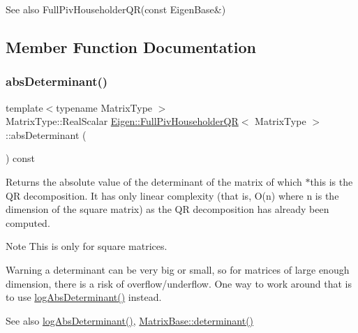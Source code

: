 \begin{DoxySeeAlso}{See also}
Full\+Piv\+Householder\+Q\+R(const Eigen\+Base\&) 
\end{DoxySeeAlso}


\subsection{Member Function Documentation}
\mbox{\label{class_eigen_1_1_full_piv_householder_q_r_a1029e1ccc70bb8669043c5775e7f3b75}} 
\subsubsection{\texorpdfstring{absDeterminant()}{absDeterminant()}}
{\footnotesize\ttfamily template$<$typename Matrix\+Type $>$ \\
Matrix\+Type\+::\+Real\+Scalar \mbox{\hyperlink{class_eigen_1_1_full_piv_householder_q_r}{Eigen\+::\+Full\+Piv\+Householder\+QR}}$<$ Matrix\+Type $>$\+::abs\+Determinant (\begin{DoxyParamCaption}{ }\end{DoxyParamCaption}) const}

\begin{DoxyReturn}{Returns}
the absolute value of the determinant of the matrix of which $\ast$this is the QR decomposition. It has only linear complexity (that is, O(n) where n is the dimension of the square matrix) as the QR decomposition has already been computed.
\end{DoxyReturn}
\begin{DoxyNote}{Note}
This is only for square matrices.
\end{DoxyNote}
\begin{DoxyWarning}{Warning}
a determinant can be very big or small, so for matrices of large enough dimension, there is a risk of overflow/underflow. One way to work around that is to use \mbox{\hyperlink{class_eigen_1_1_full_piv_householder_q_r_aafde38918912c9b562f44b0fc3b22589}{log\+Abs\+Determinant()}} instead.
\end{DoxyWarning}
\begin{DoxySeeAlso}{See also}
\mbox{\hyperlink{class_eigen_1_1_full_piv_householder_q_r_aafde38918912c9b562f44b0fc3b22589}{log\+Abs\+Determinant()}}, \mbox{\hyperlink{class_eigen_1_1_matrix_base_a7ad8f77004bb956b603bb43fd2e3c061}{Matrix\+Base\+::determinant()}} 
\end{DoxySeeAlso}
\mbox{\label{class_eigen_1_1_full_piv_householder_q_r_abeda6d91e196c13d4dd8b7542fef3e17}} 
